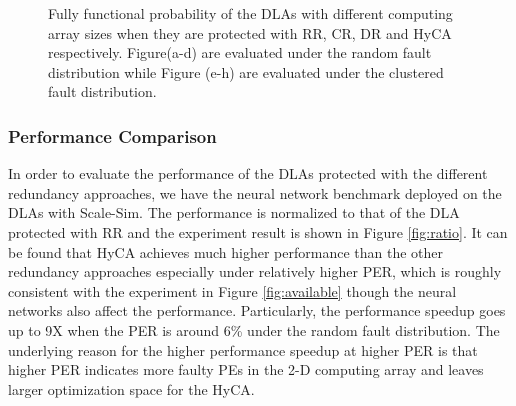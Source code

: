 \begin{figure}
\setlength{\abovecaptionskip}{-10pt}
\setlength{\belowcaptionskip}{0pt}
    \caption{Fully functional probability of the DLAs with different computing array sizes when they are protected with RR, CR, DR and HyCA respectively. Figure(a-d) are evaluated under the random fault distribution while Figure (e-h) are evaluated under the clustered fault distribution.}
\label{fig:scalability}
\vspace{-1em}
\end{figure}

\subsubsection{Performance Comparison}
In order to evaluate the performance of the DLAs protected with the different redundancy approaches, we have the neural network benchmark deployed on the DLAs with Scale-Sim. The performance is normalized to that of the DLA protected with RR and the experiment result is shown in Figure \ref{fig:ratio}. It can be found that HyCA achieves much higher performance than the other redundancy approaches especially under relatively higher PER, which is roughly consistent with the experiment in Figure \ref{fig:available} though the neural networks also affect the performance. Particularly, the performance speedup goes up to 9X when the PER is around 6\% under the random fault distribution. The underlying reason for the higher performance speedup at higher PER is that higher PER indicates more faulty PEs in the 2-D computing array and leaves larger optimization space for the HyCA. 

